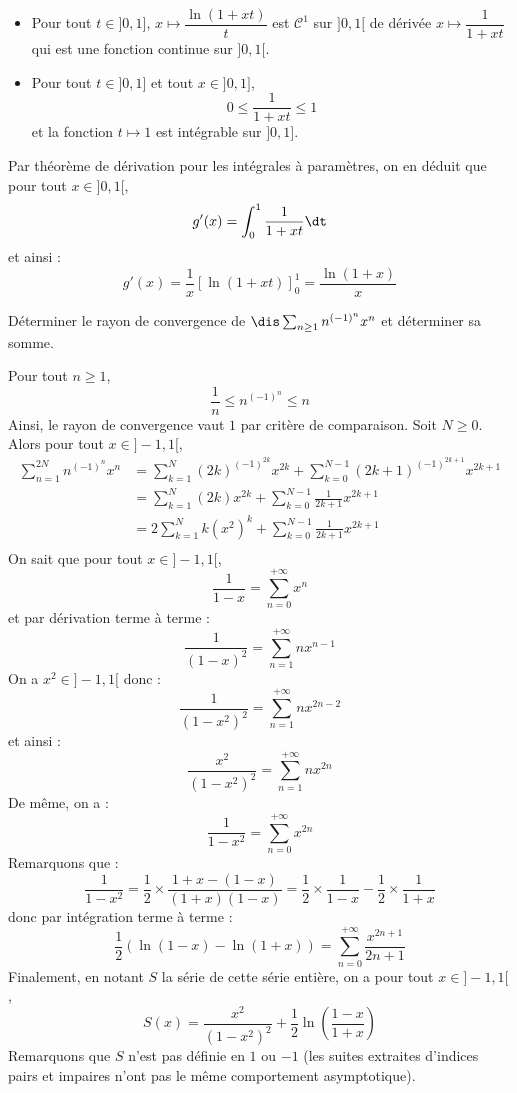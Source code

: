 \documentclass[a4paper,10pt]{report}
\begin{document}
\begin{enumerate}
\begin{itemize}
\item Pour tout $t \in ]0,1]$, $x \mapsto \dfrac{\ln(1+xt)}{t}$ est $\mathcal{C}^1$ sur $]0,1[$ de dérivée $x \mapsto \dfrac{1}{1+xt}$ qui est une fonction continue sur $]0,1[$.
\item Pour tout $t \in ]0,1]$ et tout $x \in ]0,1]$,
$$ 0 \leq \dfrac{1}{1+xt} \leq 1$$
et la fonction $t \mapsto 1$ est intégrable sur $]0,1]$.
\end{itemize}
Par théorème de dérivation pour les intégrales à paramètres, on en déduit que pour tout $x \in ]0,1[$,
$$ g'(x) = \int_{0}^1 \dfrac{1}{1+xt} \dt$$
et ainsi :
$$ g'(x) = \dfrac{1}{x} [ \ln(1+xt) ]_0^1 = \dfrac{\ln(1+x)}{x}$$
\end{enumerate}


\begin{exa} Déterminer le rayon de convergence de $\dis \sum_{n \geq 1} n^{(-1)^n} x^n$ et déterminer sa somme.
\end{exa}

\begin{corr} Pour tout $n \geq 1$,
$$ \dfrac{1}{n} \leq n^{(-1)^n} \leq n$$
Ainsi, le rayon de convergence vaut $1$ par critère de comparaison. Soit $N \geq 0$. Alors pour tout $x \in ]-1,1[$,
\begin{align*}
\sum_{n=1}^{2N} n^{(-1)^n} x^n & = \sum_{k=1}^{N} (2k)^{(-1)^{2k}} x^{2k} + \sum_{k=0}^{N-1} (2k+1)^{(-1)^{2k+1}} x^{2k+1} \\
& =  \sum_{k=1}^{N} (2k) x^{2k} + \sum_{k=0}^{N-1} \frac{1}{2k+1} x^{2k+1} \\
& = 2  \sum_{k=1}^{N} k (x^{2})^k + \sum_{k=0}^{N-1} \frac{1}{2k+1} x^{2k+1} \\
\end{align*}
On sait que pour tout $x \in ]-1,1[$,
$$ \dfrac{1}{1-x} = \sum_{n=0}^{+ \infty} x^n $$
et par dérivation terme à terme :
$$ \dfrac{1}{(1-x)^2} = \sum_{n=1}^{+ \infty} n x^{n-1}$$
On a $x^2 \in ]-1,1[$ donc :
$$ \dfrac{1}{(1-x^2)^2} = \sum_{n=1}^{+ \infty} n x^{2n-2}$$
et ainsi :
$$ \dfrac{x^2}{(1-x^2)^2} = \sum_{n=1}^{+ \infty} n x^{2n}$$
De même, on a :
$$ \dfrac{1}{1-x^2} = \sum_{n=0}^{+ \infty} x^{2n} $$
Remarquons que :
$$ \dfrac{1}{1-x^2} = \dfrac{1}{2} \times \dfrac{1+x - (1-x)}{(1+x)(1-x)} = \dfrac{1}{2} \times \dfrac{1}{1-x} - \dfrac{1}{2} \times \dfrac{1}{1+x} $$
donc par intégration terme à terme :
$$ \dfrac{1}{2} ( \ln(1-x)-\ln(1+x) ) = \sum_{n=0}^{+ \infty} \dfrac{x^{2n+1}}{2n+1}$$
Finalement, en notant $S$ la série de cette série entière, on a pour tout $x \in ]-1,1[$,
$$ S(x) = \dfrac{x^2}{(1-x^2)^2} + \dfrac{1}{2} \ln \left( \dfrac{1-x}{1+x} \right)$$
Remarquons que $S$ n'est pas définie en $1$ ou $-1$ (les suites extraites d'indices pairs et impaires n'ont pas le même comportement asymptotique).
\end{corr}
\end{document}
